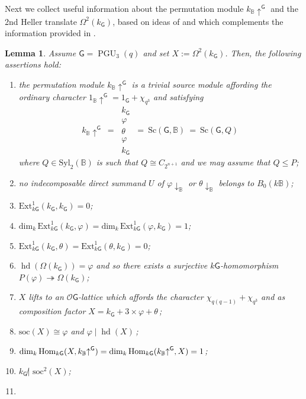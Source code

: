 \documentclass[12pt,a4paper]{amsart}
\theoremstyle{plain}\newtheorem{Theorem}{Theorem}[section]
\theoremstyle{plain}\newtheorem{Conjecture}[Theorem]{Conjecture}
\theoremstyle{plain}\newtheorem{Corollary}[Theorem]{Corollary}
\theoremstyle{plain}\newtheorem{Lemma}[Theorem]{Lemma}
\theoremstyle{plain}\newtheorem{Proposition}[Theorem]{Proposition}
\theoremstyle{definition}\newtheorem{Definition}[Theorem]{Definition}
\theoremstyle{definition}\newtheorem{Example}[Theorem]{Example}
\theoremstyle{definition}\newtheorem{Examples}[Theorem]{Examples}
\theoremstyle{definition}\newtheorem{Remark}[Theorem]{Remark}
\theoremstyle{definition}\newtheorem{Question}[Theorem]{Question}
\theoremstyle{definition}\newtheorem{Notation}[Theorem]{Notation}
\theoremstyle{definition}\newtheorem{Hypothesis}[Theorem]{Hypothesis}
\theoremstyle{definition}\newtheorem{Assumption}[Theorem]{Assumption}
\theoremstyle{definition}\newtheorem{Strategy}[Theorem]{Strategy}
\theoremstyle{definition}\newtheorem{Contents}[Theorem]{Contents}
\theoremstyle{definition}\newtheorem{Computations}[Theorem]{Computations}
\theoremstyle{definition}\newtheorem{Equivalences}[Theorem]{Equivalences}
\theoremstyle{definition}\newtheorem{Notation/Definition}[Theorem]{Notation/Definition}
\theoremstyle{definition}\newtheorem{noth}[Theorem]{}
\theoremstyle{plain}\newtheorem{Step}[Theorem]{Step}
\def\Syl{\mathrm{Syl}}
\def\dim{\mathrm{dim}}
\def\Ext{\mathrm{Ext}}
\def\soc{\mathrm{soc}} \def\tenOS{\otimes_{\mathcal{O}S}} \def\Tr{\mathrm{Tr}}
\newcommand{\hd}{\operatorname{hd}}
\newcommand{\PGU}{\operatorname{PGU}}
\begin{document}
Next we collect useful information about the permutation module  $k_{\mathbb B}{\uparrow}^{\mathsf{G}}$ and the 2nd Heller translate $\Omega^{2}(k_{\mathsf{G}})$,
based on ideas of  \cite[pp.\,259--260 and p.\,263]{OW02} and which complements the information provided in \cite[pp.\,227--228]{His04}. 


\begin{Lemma}\label{OkyWaki}%
Assume $\mathsf{G}=\PGU_3(q)$ and set $X:=\Omega^2(k_{\mathsf{G}})$. Then, the following assertions hold:
\begin{enumerate} 
\renewcommand{\labelenumi}{\rm{(\alph{enumi})}} 
\item 
the permutation module $k_{\mathbb B}{\uparrow}^\mathsf{G}$ is a trivial source module  affording the ordinary character ${1_{\mathbb B}}{\uparrow}^\mathsf{G} =1_{\mathsf{G}}+\chi_{q^3}$
and satisfying 
$$ 
{k_{\mathbb B}}{\uparrow}^\mathsf{G} \ = \ 
\boxed{\begin{matrix}
k_\mathsf{G}\\ \varphi\\ \theta\\ \varphi\\k_\mathsf{G}
\end{matrix}}
\ = \ {\mathrm{Sc}}(\mathsf{G},\mathbb B)\ = \ {\mathrm{Sc}}(\mathsf{G}, Q)\,
$$
where $Q\in\Syl_2(\mathbb B)$ is such that  $Q\cong C_{2^{n+1}}$ and we may assume that $Q\leq P$;
\item
no indecomposable 
direct summand 
$U$ of $\varphi{\downarrow}_{\mathbb B}$ or  $\theta{\downarrow}_{\mathbb B}$ 
 belongs to $B_0(k\mathbb B)$;
\item 
$\Ext_{k\mathsf{G}}^1(k_\mathsf{G}, k_\mathsf{G})=0$;
\item 
$\dim_k\,\Ext_{k\mathsf{G}}^1(k_\mathsf{G}, \varphi)=\dim_k\,\Ext_{k\mathsf{G}}^1(\varphi,k_\mathsf{G})=1$;
\item 
$\Ext_{k\mathsf{G}}^1(k_\mathsf{G}, \theta)=\Ext_{k\mathsf{G}}^1(\theta,k_\mathsf{G})=0$;
\item  
$\hd(\Omega(k_\mathsf{G}))=\varphi$ and so there exists a surjective $k\mathsf{G}$-homomorphism 
$P(\varphi)\twoheadrightarrow\Omega(k_\mathsf{G})$;
\item
$X$ lifts to an $\mathcal O\mathsf{G}$-lattice which affords the character 
$\chi_{q(q-1)}+\chi_{q^3}$ and  as composition factor 
$X= k_\mathsf{G}+3\times\varphi+\theta$\,;
\item 
$\soc(X)\cong\varphi$ and $\varphi\mid \hd(X)$\,;
\item
$\dim_k\,\Hom_{k\mathsf{G}}(X, k_{\mathbb B}{\uparrow}^\mathsf{G})=
\dim_k\,\Hom_{k\mathsf{G}}(k_{\mathbb B}{\uparrow}^\mathsf{G},X)=1$;
\item
$k_\mathsf{G} \not| \,\, \soc^2(X)$;
\item


\end{enumerate}
\end{Lemma}
\end{document}

